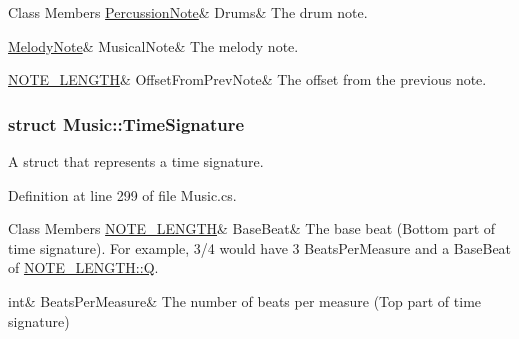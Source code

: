 \begin{DoxyFields}{Class Members}
\mbox{\label{group___music_structs_a934e18932962add64b76fe34fc705aa3}} 
\hyperlink{group___music_structs_struct_music_1_1_percussion_note}{PercussionNote}&
Drums&
The drum note. \\
\hline

\mbox{\label{group___music_structs_ad310b7add1f22dac7cb3d6979a233718}} 
\hyperlink{group___music_structs_struct_music_1_1_melody_note}{MelodyNote}&
MusicalNote&
The melody note. \\
\hline

\mbox{\label{group___music_structs_ae281187907aed4c728c7981300dbebaf}} 
\hyperlink{group___music_enums_gaf11b5f079adbb21c800b9eca1c5c3cbd}{NOTE\_LENGTH}&
OffsetFromPrevNote&
The offset from the previous note. \\
\hline

\end{DoxyFields}
\label{struct_music_1_1_time_signature}
\subsubsection{struct Music\+:\+:Time\+Signature}
A struct that represents a time signature. 

Definition at line 299 of file Music.\+cs.

\begin{DoxyFields}{Class Members}
\mbox{\label{group___music_structs_aaf5b010a2541959c26f96630db042ee8}} 
\hyperlink{group___music_enums_gaf11b5f079adbb21c800b9eca1c5c3cbd}{NOTE\_LENGTH}&
BaseBeat&
The base beat (Bottom part of time signature). For example, 3/4 would have 3 Beats\+Per\+Measure and a Base\+Beat of \hyperlink{group___music_enums_ggaf11b5f079adbb21c800b9eca1c5c3cbdaf09564c9ca56850d4cd6b3319e541aee}{N\+O\+T\+E\+\_\+\+L\+E\+N\+G\+T\+H\+::Q}. \\
\hline

\mbox{\label{group___music_structs_acda79d249e7a1974a152832a881e9f0b}} 
int&
BeatsPerMeasure&
The number of beats per measure (Top part of time signature) \\
\hline

\end{DoxyFields}
